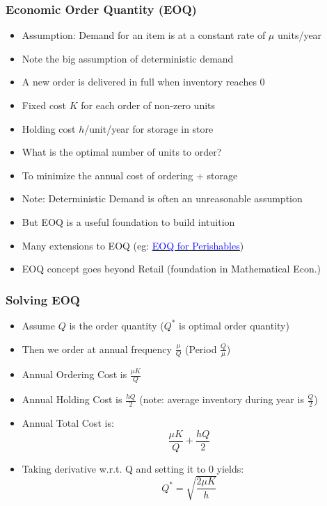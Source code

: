 \documentclass[handout]{beamer}
\begin{document}
\begin{frame}
\frametitle{Economic Order Quantity (EOQ)}
\pause
\begin{itemize}[<+->]
\item Assumption: Demand for an item is at a constant rate of $\mu$ units/year
\item Note the big assumption of deterministic demand
\item A new order is delivered in full when inventory reaches 0
\item Fixed cost $K$ for each order of non-zero units
\item Holding cost $h$/unit/year for storage in store 
\item What is the optimal number of units to order?
\item To minimize the annual cost of ordering + storage
\item Note: Deterministic Demand is often an unreasonable assumption
\item But EOQ is a useful foundation to build intuition
\item Many extensions to EOQ (eg: \href{https://github.com/coverdrive/technical-documents/blob/master/supply_chain/EOQSpoilage/EOQSpoilage.pdf}{\underline{\textcolor{blue}{EOQ for Perishables}}})
\item EOQ concept goes beyond Retail (foundation in Mathematical Econ.)
\end{itemize}
\end{frame}

\begin{frame}
\frametitle{Solving EOQ}
\pause
\begin{itemize}[<+->]
\item Assume $Q$ is the order quantity ($Q^*$ is optimal order quantity)
\item Then we order at annual frequency $\frac \mu Q$ (Period $\frac Q \mu$)
\item Annual Ordering Cost is $ \frac {\mu K} Q$
\item Annual Holding Cost is $\frac {hQ} 2$ (note: average inventory during year is $\frac Q 2$)
\item Annual Total Cost is:
$$\frac {\mu K} Q + \frac {hQ} 2$$
\item Taking derivative w.r.t. Q and setting it to 0 yields:
$$Q^* = \sqrt{\frac {2 \mu K} h}$$
\end{itemize}
\end{frame}
\end{document}
